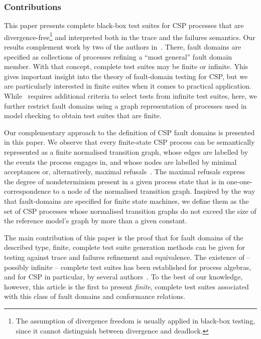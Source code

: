 
\subsubsection*{Contributions}

This paper presents complete black-box test suites for CSP processes that are
divergence-free\footnote{The assumption of divergence freedom is usually
applied in black-box testing, since it cannot distinguish between divergence
and deadlock.} and interpreted both in the trace and the failures semantics.
Our results complement work by two of the authors
in~\cite{DBLP:conf/pts/CavalcantiS17}. There, fault domains are specified as
collections of processes refining a  ``most general'' fault domain member.
With that concept, complete test suites may be finite or infinite. Yhis gives
important insight into the theory of fault-domain testing for CSP, but we are
particularly interested in finite suites when it comes to practical
application. While~\cite{DBLP:conf/pts/CavalcantiS17} requires additional
criteria to select tests from infinite test suites, here, we further restrict
fault domains using a graph representation of processes used in model
checking to obtain test suites that are finite.

Our complementary approach to the definition of CSP fault domains is
presented in this paper. We observe that every finite-state CSP process can
be semantically represented as a finite normalised transition graph, whose
edges are labelled by the events the process engages in, and whose nodes are
labelled by minimal acceptances or, alternatively, maximal
refusals~\cite{Roscoe:1994:CME:197600}. The maximal refusals express the
degree of nondeterminism present in a given process state that is in
one-one-correspondence to a node of the normalised transition graph. Inspired
by the way that fault-domains are specified for finite state machines, we
define them as the set of CSP processes whose normalised transition graphs do
not exceed the size of the reference model's graph by more than a given
constant.

The main contribution of this paper is the proof that for fault domains of
the described type, finite, complete test suite generation methods can be
given for testing against trace and failures refinement and equivalence. The
existence of -- possibly infinite -- complete test suites has been
established for process algebras, and for CSP in particular, by several
authors~\cite{Hennessy:1988:ATP:50497,Schneider:1995:OST:203471.203475,DBLP:conf/fm/PeleskaS96,peleska1997a,DBLP:conf/pts/CavalcantiS17}.
To the best of our knowledge, however, this article is the first to present
{\it finite}, complete test suites associated with this class of fault
domains and conformance relations.

